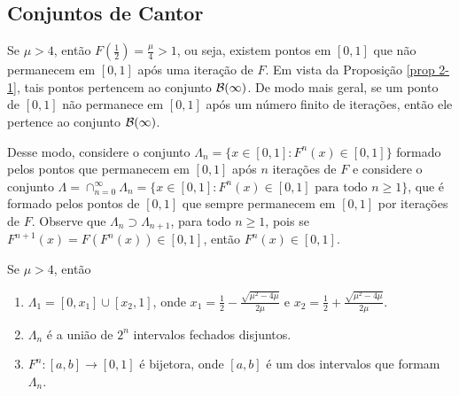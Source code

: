 \subsection{Conjuntos de Cantor}

Se $\mu > 4$, então $F\left(\frac{1}{2}\right) = \frac{\mu}{4} > 1$, ou seja, existem pontos em $[0, 1]$ que não permanecem em $[0, 1]$ após uma iteração de $F$. Em vista da Proposição \ref{prop 2-1}, tais pontos pertencem ao conjunto $\mathcal{B}(\infty)$. De modo mais geral, se um ponto de $[0, 1]$ não permanece em $[0, 1]$ após um número finito de iterações, então ele pertence ao conjunto $\mathcal{B}(\infty)$. 

Desse modo, considere o conjunto $\Lambda_n = \{x \in [0, 1] : F^n(x) \in [0, 1]\}$ formado pelos pontos que permanecem em $[0, 1]$ após $n$ iterações de $F$ e considere o conjunto $\Lambda = \cap_{n=0}^{\infty} \Lambda_n = \{x \in [0, 1] : F^n(x) \in [0, 1] \textrm{ para todo } n \geq 1\}$, que é formado pelos pontos de $[0, 1]$ que sempre permanecem em $[0, 1]$ por iterações de $F$. Observe que $\Lambda_n \supset \Lambda_{n+1}$, para todo $n \geq 1$, pois se $F^{n+1}(x) = F(F^n(x)) \in [0,1]$, então $F^n(x) \in [0,1]$.

\begin{proposition} \label{proposicao conjuntosdecantor 1}
Se $\mu > 4$, então
\begin{enumerate}
\item $\Lambda_1 = [0, x_1] \cup [x_2, 1]$, onde $x_1 = \frac{1}{2} - \frac{\sqrt{\mu^2 - 4\mu}}{2\mu}$ e $x_2 = \frac{1}{2} + \frac{\sqrt{\mu^2 - 4\mu}}{2\mu}$.
\item $\Lambda_n$ é a união de $2^n$ intervalos fechados disjuntos.
\item $F^n: [a, b] \to [0, 1]$ é bijetora, onde $[a, b]$ é um dos intervalos que formam $\Lambda_n$.
\end{enumerate}
\end{proposition}

